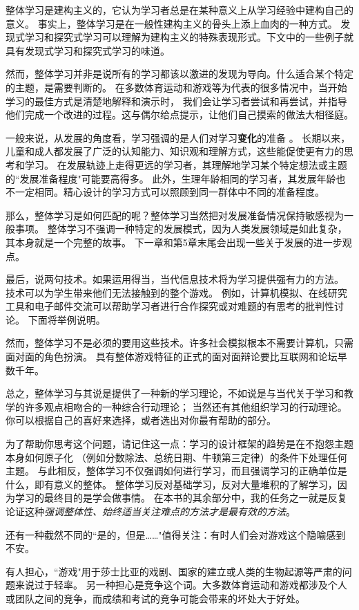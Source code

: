 整体学习是建构主义的，它认为学习者总是在某种意义上从学习经验中建构自己的意义。
事实上，整体学习是在一般性建构主义的骨头上添上血肉的一种方式。
发现式学习和探究式学习可以理解为建构主义的特殊表现形式。下文中的一些例子就具有发现式学习和探究式学习的味道。

然而，整体学习并非是说所有的学习都该以激进的发现为导向。什么适合某个特定的主题，是需要判断的。
在多数体育运动和游戏等为代表的很多情况中，当开始学习的最佳方式是清楚地解释和演示时，
我们会让学习者尝试和再尝试，并指导他们完成一个改进的过程。这与偶尔给点提示，让他们自己摸索的做法大相径庭。

一般来说，从发展的角度看，学习强调的是人们对学习\textbf{变化}的准备 。
长期以来，儿童和成人都发展了广泛的认知能力、知识观和理解方式，这些能促使更有力的思考和学习。
在发展轨迹上走得更远的学习者，其理解地学习某个特定想法或主题的``发展准备程度"可能要高得多。
此外，生理年龄相同的学习者，其发展年龄也不一定相同。精心设计的学习方式可以照顾到同一群体中不同的准备程度。

那么，整体学习是如何匹配的呢？整体学习当然把对发展准备情况保持敏感视为一般事项。
整体学习不强调一种特定的发展模式，因为人类发展领域是如此复杂，其本身就是一个完整的故事。
下一章和第5章末尾会出现一些关于发展的进一步观点。

最后，说两句技术。如果运用得当，当代信息技术将为学习提供强有力的方法。
技术可以为学生带来他们无法接触到的整个游戏。
例如，计算机模拟、在线研究工具和电子邮件交流可以帮助学习者进行合作探究或对难题的有思考的批判性讨论。
下面将举例说明。

然而，整体学习不是必须的要用这些技术。许多社会模拟根本不需要计算机，只需面对面的角色扮演。
具有整体游戏特征的正式的面对面辩论要比互联网和论坛早数千年。

总之，整体学习与其说是提供了一种新的学习理论，不如说是与当代关于学习和教学的许多观点相吻合的一种综合行动理论；
当然还有其他组织学习的行动理论。你可以根据自己的喜好来选择，或者选出对你最有帮助的部分。

为了帮助你思考这个问题，请记住这一点：学习的设计框架的趋势是在不抱怨主题本身如何原子化
（例如分数除法、总统日期、牛顿第三定律）的条件下处理任何主题。
与此相反，整体学习不仅强调如何进行学习，而且强调学习的正确单位是什么，即有意义的整体。
整体学习反对基础学习，反对大量堆积的了解学习，因为学习的最终目的是学会做事情。
在本书的其余部分中，我的任务之一就是反复论证这种\textit{强调整体性、始终适当关注难点的方法才是最有效的方法}。

还有一种截然不同的``是的，但是……"值得关注：有时人们会对游戏这个隐喻感到不安。

有人担心，``游戏"用于莎士比亚的戏剧、国家的建立或人类的生物起源等严肃的问题来说过于轻率。
另一种担心是竞争这个词。大多数体育运动和游戏都涉及个人或团队之间的竞争，而成绩和考试的竞争可能会带来的坏处大于好处。

